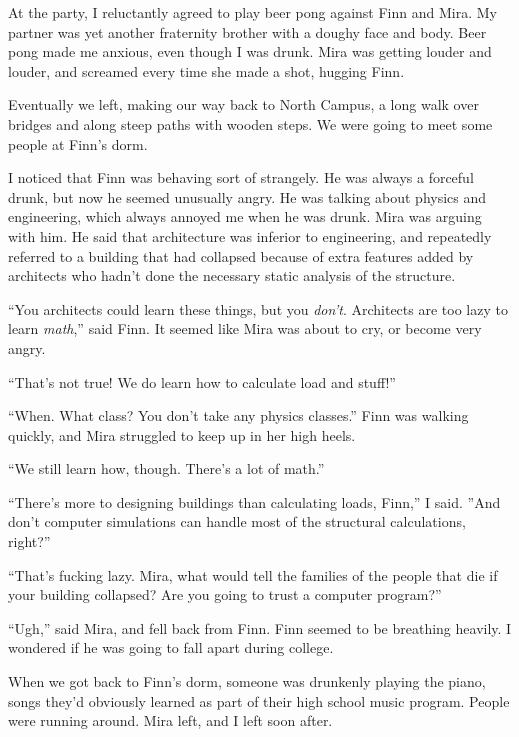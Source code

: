 At the party, I reluctantly agreed to play beer pong against Finn and Mira.  My
partner was yet another fraternity brother with a doughy face and body.  Beer
pong made me anxious, even though I was drunk.  Mira was getting louder and
louder, and screamed every time she made a shot, hugging Finn.

Eventually we left, making our way back to North Campus, a long walk over
bridges and along steep paths with wooden steps.  We were going to meet
some people at Finn's dorm. 

I noticed that Finn was behaving sort of strangely.  He was always a forceful
drunk, but now he seemed unusually angry.  He was talking about physics and
engineering, which always annoyed me when he was drunk.  Mira was arguing with
him.  He said that architecture was inferior to engineering, and repeatedly
referred to a building that had collapsed because of extra features added by
architects who hadn't done the necessary static analysis of the structure.

``You architects could learn these things, but you \textit{don't}.  Architects
are too lazy to learn \textit{math},'' said Finn.  It seemed like Mira was
about to cry, or become very angry.

``That's not true!  We do learn how to calculate load and stuff!''

``When.  What class?  You don't take any physics classes.''  Finn was walking
quickly, and Mira struggled to keep up in her high heels.

``We still learn how, though.  There's a lot of math.''

``There's more to designing buildings than calculating loads, Finn,'' I said.
''And don't computer simulations can handle most of the structural calculations,
right?''

``That's fucking lazy.  Mira, what would tell the families of the people that
die if your building collapsed?  Are you going to trust a computer program?'' 

``Ugh,'' said Mira, and fell back from Finn.  Finn seemed to be breathing
heavily.  I wondered if he was going to fall apart during college.  

When we got back to Finn's dorm, someone was drunkenly playing the piano, songs
they'd obviously learned as part of their high school music program.  People
were running around.  Mira left, and I left soon after.  

\section{}

